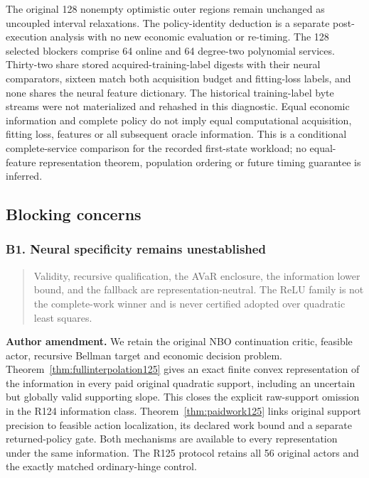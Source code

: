 The original 128 nonempty optimistic outer regions remain unchanged as
uncoupled interval relaxations. The policy-identity deduction is a separate
post-execution analysis with no new economic evaluation or re-timing. The
128 selected blockers comprise 64 online and 64 degree-two polynomial
services. Thirty-two share stored acquired-training-label digests with
their neural comparators, sixteen match both acquisition budget and
fitting-loss labels, and none shares the neural feature dictionary. The
historical training-label byte streams were not materialized and rehashed
in this diagnostic. Equal economic information and complete policy do not
imply equal computational acquisition, fitting loss, features or all
subsequent oracle information. This is a conditional complete-service
comparison for the recorded first-state workload; no equal-feature
representation theorem, population ordering or future timing guarantee
is inferred.

\subsection{Blocking concerns}

\subsubsection{B1. Neural specificity remains unestablished}

\begin{quote}\small
Validity, recursive qualification, the AVaR enclosure, the information lower bound, and the fallback are representation-neutral. The ReLU family is not the complete-work winner and is never certified adopted over quadratic least squares.
\end{quote}

\noindent\textbf{Author amendment.} We retain the original NBO continuation critic, feasible actor, recursive Bellman target and economic decision problem. Theorem~\ref{thm:fullinterpolation125} gives an exact finite convex representation of the information in every paid original quadratic support, including an uncertain but globally valid supporting slope. This closes the explicit raw-support omission in the R124 information class. Theorem~\ref{thm:paidwork125} links original support precision to feasible action localization, its declared work bound and a separate returned-policy gate. Both mechanisms are available to every representation under the same information. The R125 protocol retains all 56 original actors and the exactly matched ordinary-hinge control.


